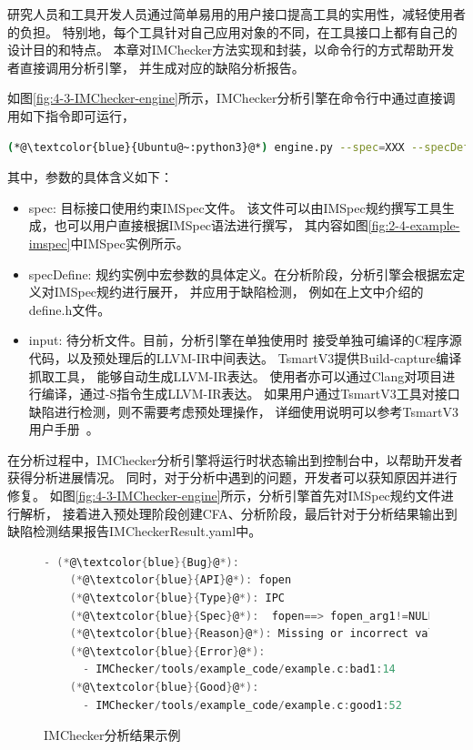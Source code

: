 研究人员和工具开发人员通过简单易用的用户接口提高工具的实用性，减轻使用者的负担。
特别地，每个工具针对自己应用对象的不同，在工具接口上都有自己的设计目的和特点。
本章对IMChecker方法实现和封装，以命令行的方式帮助开发者直接调用分析引擎，
并生成对应的缺陷分析报告。

如图\ref{fig:4-3-IMChecker-engine}所示，IMChecker分析引擎在命令行中通过直接调用如下指令即可运行，
\begin{lstlisting}[language={bash},
basicstyle=\linespread{0.8}\listingsfont,
numbers=none,
xleftmargin=.1\textwidth]
(*@\textcolor{blue}{Ubuntu@~:python3}@*) engine.py --spec=XXX --specDefine=XXX --input=XXX
\end{lstlisting}
其中，参数的具体含义如下：
\begin{itemize}
	\item spec: 目标接口使用约束IMSpec文件。
	该文件可以由IMSpec规约撰写工具生成，也可以用户直接根据IMSpec语法进行撰写，
	其内容如图\ref{fig:2-4-example-imspec}中IMSpec实例所示。
	\item specDefine: 规约实例中宏参数的具体定义。在分析阶段，分析引擎会根据宏定义对IMSpec规约进行展开，
	并应用于缺陷检测，
	例如在上文中介绍的define.h文件。
	\item input: 待分析文件。目前，分析引擎在单独使用时
	接受单独可编译的C程序源代码，以及预处理后的LLVM-IR中间表达。
	TsmartV3提供Build-capture编译抓取工具，
	能够自动生成LLVM-IR表达。
	使用者亦可以通过Clang对项目进行编译，通过-S指令生成LLVM-IR表达。
	如果用户通过TsmartV3工具对接口缺陷进行检测，则不需要考虑预处理操作，
	详细使用说明可以参考TsmartV3用户手册~\cite{tsmart}。
\end{itemize}

在分析过程中，IMChecker分析引擎将运行时状态输出到控制台中，以帮助开发者获得分析进展情况。
同时，对于分析中遇到的问题，开发者可以获知原因并进行修复。
如图\ref{fig:4-3-IMChecker-engine}所示，分析引擎首先对IMSpec规约文件进行解析，
接着进入预处理阶段创建CFA、分析阶段，最后针对于分析结果输出到缺陷检测结果报告IMCheckerResult.yaml中。

\begin{figure}[b]
	\centering
	\begin{minipage}{0.7\linewidth}
\begin{lstlisting}[language={C},
basicstyle=\linespread{0.7}\listingsfont,
numbers=none,frame=trBL,
xleftmargin=0pt]
  - (*@\textcolor{blue}{Bug}@*):
    (*@\textcolor{blue}{API}@*): fopen
    (*@\textcolor{blue}{Type}@*): IPC
    (*@\textcolor{blue}{Spec}@*):  fopen==> fopen_arg1!=NULL
    (*@\textcolor{blue}{Reason}@*): Missing or incorrect validation of parameter
    (*@\textcolor{blue}{Error}@*): 
      - IMChecker/tools/example_code/example.c:bad1:14
    (*@\textcolor{blue}{Good}@*): 
      - IMChecker/tools/example_code/example.c:good1:52
\end{lstlisting}
	\end{minipage}
	\caption{
		IMChecker分析结果示例
	}
	\label{fig:4-3-Result}
\end{figure}

